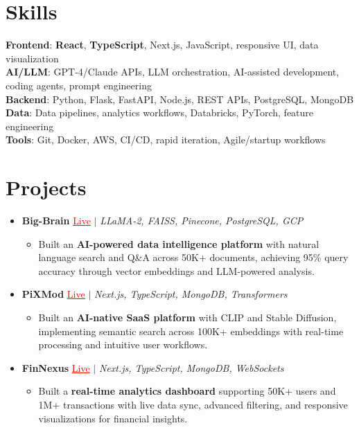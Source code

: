 \documentclass[letterpaper,10pt]{article}
\newcommand{\resumeItem}[1]{\item\small{{#1 \vspace{-2pt}}}}
\newcommand{\resumeProjectHeading}[1]{\item \small #1 \vspace{-2pt}}
\newcommand{\resumeSubHeadingListStart}{\begin{itemize}[leftmargin=0.0in, label={}]}
\newcommand{\resumeSubHeadingListEnd}{\end{itemize}}
\newcommand{\resumeProjItemListStart}{\begin{itemize}[leftmargin=0.15in,label=\textbullet,itemsep=0pt,topsep=0pt,parsep=0pt,partopsep=0pt]}
\newcommand{\resumeProjItemListEnd}{\end{itemize}\vspace{-4pt}}
\begin{document}
\section{Skills}
\begin{itemize}[leftmargin=0.15in, label={}]
\small{\item{
\textbf{Frontend}: \textbf{React}, \textbf{TypeScript}, Next.js, JavaScript, responsive UI, data visualization \\
\textbf{AI/LLM}: GPT-4/Claude APIs, LLM orchestration, AI-assisted development, coding agents, prompt engineering \\
\textbf{Backend}: Python, Flask, FastAPI, Node.js, REST APIs, PostgreSQL, MongoDB \\
\textbf{Data}: Data pipelines, analytics workflows, Databricks, PyTorch, feature engineering \\
\textbf{Tools}: Git, Docker, AWS, CI/CD, rapid iteration, Agile/startup workflows
}}
\end{itemize}
\vspace{-16pt}
\section{Projects}
\resumeSubHeadingListStart
\vspace{-2pt}
\resumeProjectHeading{\textbf{Big-Brain} {\href{https://big-brain-pied.vercel.app/}{\textcolor{red}{\underline{Live}}}} $|$ \emph{LLaMA-2, FAISS, Pinecone, PostgreSQL, GCP}}
\resumeProjItemListStart
\resumeItem{Built an \textbf{AI-powered data intelligence platform} with natural language search and Q\&A across 50K+ documents, achieving 95\% query accuracy through vector embeddings and LLM-powered analysis.}
\resumeProjItemListEnd
\vspace{3pt}
\resumeProjectHeading{\textbf{PiXMod} {\href{https://pixmod.vercel.app/}{\textcolor{red}{\underline{Live}}}} $|$ \emph{Next.js, TypeScript, MongoDB, Transformers}}
\resumeProjItemListStart
\resumeItem{Built an \textbf{AI-native SaaS platform} with CLIP and Stable Diffusion, implementing semantic search across 100K+ embeddings with real-time processing and intuitive user workflows.}
\resumeProjItemListEnd
\vspace{3pt}
\resumeProjectHeading{\textbf{FinNexus} {\href{https://fin-nexus.vercel.app/}{\textcolor{red}{\underline{Live}}}} $|$ \emph{Next.js, TypeScript, MongoDB, WebSockets}}
\resumeProjItemListStart
\resumeItem{Built a \textbf{real-time analytics dashboard} supporting 50K+ users and 1M+ transactions with live data sync, advanced filtering, and responsive visualizations for financial insights.}
\resumeProjItemListEnd
\resumeSubHeadingListEnd
\end{document}
